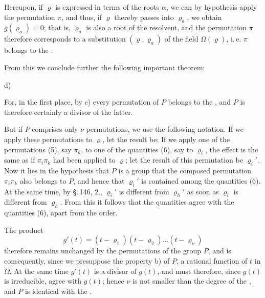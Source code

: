 
Hereupon, if $\varrho$ is expressed in terms of the roots $\alpha$, we can by hypothesis apply the permutation $\pi$, and thus, if $\varrho$ thereby passes into $\varrho_a$, we obtain $g(\varrho_a) = 0$; that is, $\varrho_a$ is also a root of the resolvent, and the permutation $\pi$ therefore corresponds to a substitution $(\varrho, \varrho_a)$ of the field $\Omega(\varrho)$, i.\,e. $\pi$ belongs to the .

From this we conclude further the following important theorem:

d) 

For, in the first place, by c) every permutation of $P$ belongs to the , and $P$ is therefore certainly a divisor of the latter.

But if $P$ comprises only $\nu$ permutations, we use the following notation.
If we apply these permutations to $\varrho$, let the result be:
If we apply one of the permutations (5), say $\pi_k$, to one of the quantities (6), say to $\varrho_i$, the effect is the same as if $\pi_i \pi_k$ had been applied to $\varrho$; let the result of this permutation be $\varrho_i'$. Now it lies in the hypothesis that $P$ is a group that the composed permutation $\pi_i \pi_k$ also belongs to $P$, and hence that $\varrho_i'$ is contained among the quantities (6). At the same time, by \S.\,146, 2., $\varrho_i'$ is different from $\varrho_h'$ as soon as $\varrho_i$ is different from $\varrho_h$. From this it follows that the quantities
agree with the quantities (6), apart from the order.

The product
\[
g'(t) = (t - \varrho_1)(t - \varrho_2) \ldots (t - \varrho_\nu)
\]
therefore remains unchanged by the permutations of the group $P$, and is consequently, since we presuppose the property b) of $P$, a rational function of $t$ in $\Omega$. At the same time $g'(t)$ is a divisor of $g(t)$, and must therefore, since $g(t)$ is irreducible, agree with $g(t)$; hence $\nu$ is not smaller than the degree of the , and $P$ is identical with the .
